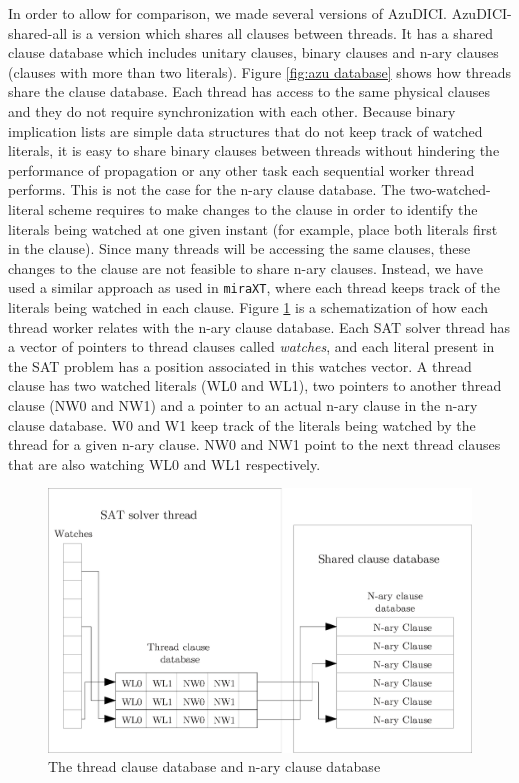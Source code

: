 \documentclass{llncs}
\begin{document}
In order to allow for comparison, we made several versions of AzuDICI.
AzuDICI-shared-all is a version which shares all clauses between
threads. It has a shared clause database which includes unitary
clauses, binary clauses and n-ary clauses (clauses with more than
two literals). Figure \ref{fig:azu database}
shows how threads share the clause database. Each thread has access
to the same physical clauses and they do not require synchronization
with each other.
Because binary implication lists are simple data structures that do
not keep track of watched literals, it is easy to share binary clauses
between threads without hindering the performance of propagation
or any other task each sequential worker thread performs. This is not
the case for the n-ary clause database. The two-watched-literal
scheme requires to make changes to the clause in order to identify
the literals being watched at one given instant (for example, place
both literals first in the clause). Since many threads will be
accessing the same clauses, these changes to the clause are not
feasible to share n-ary clauses. Instead, we have used a similar 
approach as used in
{\tt miraXT}, where each thread keeps track of the literals being
watched in each clause. Figure \ref{fig:azu design} is a
schematization of how each thread worker relates with the n-ary
clause database. Each SAT solver thread has a vector of pointers
to thread clauses called \textit{watches}, and each literal present
in the SAT problem has a position associated in this watches vector.
A thread clause has two watched literals (WL0 and WL1), two
pointers to another thread clause (NW0 and NW1) and a pointer to
an actual n-ary clause in the n-ary clause database. W0 and W1 keep
track of the literals being watched by the thread for a given n-ary
clause. NW0 and NW1 point to the next thread clauses that are also 
watching WL0 and WL1 respectively.

\begin{figure}[tp]
  \centering
  \includegraphics[scale=0.6]{AzuDICI_design}
  \caption{The thread clause database and n-ary clause database}
  \label{fig:azu design}
\end{figure}
\end{document}
